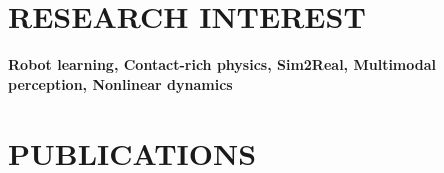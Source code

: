 \documentclass[a4paper,10pt]{extarticle}
\begin{document}

\section*{RESEARCH INTEREST}
\textbf{Robot learning, Contact-rich physics, Sim2Real, Multimodal perception, Nonlinear dynamics}



\section*{PUBLICATIONS}

\vspace*{-0.2cm}
\end{document}
